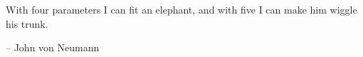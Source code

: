 
\begin{dedication} 

With four parameters I can fit an elephant, and with five I can make him wiggle his trunk.

-- John von Neumann

\end{dedication}
